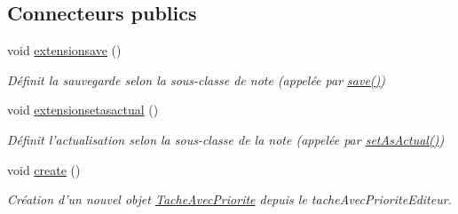 \subsection*{Connecteurs publics}
\begin{DoxyCompactItemize}
\item 
\hypertarget{class_tache_avec_priorite_editeur_a46fbeac1f204d539c7690fc1e523e53a}{void \hyperlink{class_tache_avec_priorite_editeur_a46fbeac1f204d539c7690fc1e523e53a}{extensionsave} ()}\label{class_tache_avec_priorite_editeur_a46fbeac1f204d539c7690fc1e523e53a}

\begin{DoxyCompactList}\small\item\em Définit la sauvegarde selon la sous-\/classe de note (appelée par \hyperlink{class_note_editeur_a605b1bca885c25460cb7d8863d1f3d03}{save()}) \end{DoxyCompactList}\item 
\hypertarget{class_tache_avec_priorite_editeur_a964d98a080a52565eea17d24db923b1e}{void \hyperlink{class_tache_avec_priorite_editeur_a964d98a080a52565eea17d24db923b1e}{extensionsetasactual} ()}\label{class_tache_avec_priorite_editeur_a964d98a080a52565eea17d24db923b1e}

\begin{DoxyCompactList}\small\item\em Définit l'actualisation selon la sous-\/classe de la note (appelée par \hyperlink{class_note_editeur_a857f285628a0b7dcb6a69b18c977aa71}{set\-As\-Actual()}) \end{DoxyCompactList}\item 
\hypertarget{class_tache_avec_priorite_editeur_a79a74f81dcdff4b9756a6f35acdc9f8d}{void \hyperlink{class_tache_avec_priorite_editeur_a79a74f81dcdff4b9756a6f35acdc9f8d}{create} ()}\label{class_tache_avec_priorite_editeur_a79a74f81dcdff4b9756a6f35acdc9f8d}

\begin{DoxyCompactList}\small\item\em Création d'un nouvel objet \hyperlink{class_tache_avec_priorite}{Tache\-Avec\-Priorite} depuis le tache\-Avec\-Priorite\-Editeur. \end{DoxyCompactList}\end{DoxyCompactItemize}
